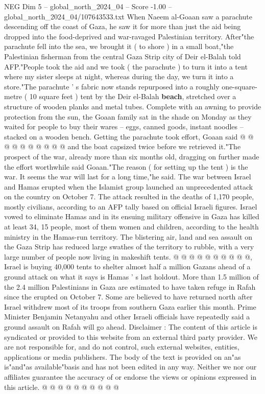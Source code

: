 \begin{textsample}{NEG Dim 5 – global\_north\_2024\_04 – Score -1.00 – global\_north\_2024\_04/107643533.txt}  \label{ex:f5_neg_197}
When Naeem al-Goaan saw a parachute descending off the coast of Gaza, he saw it for more than just the aid being dropped into the food-deprived and war-ravaged Palestinian territory.
After"the parachute fell into the sea, we brought it ( to shore ) in a small boat,"the Palestinian fisherman from the central Gaza Strip city of Deir el-Balah told AFP."People took the aid and we took ( the parachute ) to turn it into a tent where my sister sleeps at night, whereas during the day, we turn it into a store."The parachute ' s fabric now stands repurposed into a roughly one-square-metre ( 10 square feet ) tent by the Deir el-Balah \textbf{beach}, stretched over a structure of wooden planks and metal tubes.
Complete with an awning to provide protection from the sun, the Goaan family sat in the shade on Monday as they waited for people to buy their wares -- eggs, canned goods, instant noodles -- stacked on a wooden bench.
Getting the parachute took effort, Goaan said @ @ @ @ @ @ @ @ @ @ and the boat capsized twice before we retrieved it."The prospect of the war, already more than six months old, dragging on further made the effort worthwhile said Goaan."The reason ( for setting up the tent ) is the war.
It seems the war will last for a long time,"he said.
The war between Israel and Hamas erupted when the Islamist group launched an unprecedented attack on the country on October 7.
The attack resulted in the deaths of 1,170 people, mostly civilians, according to an AFP tally based on official Israeli figures.
Israel vowed to eliminate Hamas and in its ensuing military offensive in Gaza has killed at least 34, 15 people, most of them women and children, according to the health ministry in the Hamas-run territory.
The blistering air, land and sea assault on the Gaza Strip has reduced large swathes of the territory to rubble, with a very large number of people now living in makeshift tents. @ @ @ @ @ @ @ @ @ @, Israel is buying 40,000 tents to shelter almost half a million Gazans ahead of a ground attack on what it says is Hamas ' s last holdout.
More than 1.5 million of the 2.4 million Palestinians in Gaza are estimated to have taken refuge in Rafah since the erupted on October 7.
Some are believed to have returned north after Israel withdrew most of its troops from southern Gaza earlier this month.
Prime Minister Benjamin Netanyahu and other Israeli officials have repeatedly said a ground assault on Rafah will go ahead.
Disclaimer : The content of this article is syndicated or provided to this website from an external third party provider.
We are not responsible for, and do not control, such external websites, entities, applications or media publishers.
The body of the text is provided on an"as is"and"as available"basis and has not been edited in any way.
Neither we nor our affiliates guarantee the accuracy of or endorse the views or opinions expressed in this article. @ @ @ @ @ @ @ @ @ @

\end{textsample}
